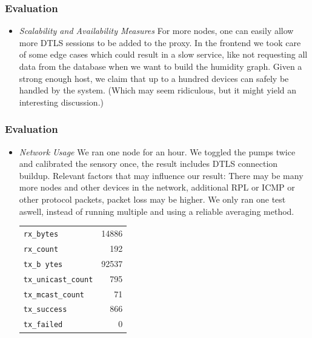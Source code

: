 \documentclass[10pt, xcolor=svgnames]{beamer}
\begin{document}
\begin{frame}
    \frametitle{Evaluation}
    \begin{itemize}
        \item \emph{Scalability and Availability Measures} For more nodes, one can easily allow more DTLS sessions to be added to the proxy. In the frontend we took care of some edge cases which could result in a slow service, like not requesting all data from the database when we want to build the humidity graph. Given a strong enough host, we claim that up to a hundred devices can safely be handled by the system. (Which may seem ridiculous, but it might yield an interesting discussion.)
    \end{itemize}
\end{frame}

\begin{frame}
    \frametitle{Evaluation}
    \begin{itemize}
        \item \emph{Network Usage} We ran one node for an hour. We toggled the pumps twice and calibrated the sensory once, the result includes DTLS connection buildup.  Relevant factors that may influence our result: There may be many more nodes and other devices in the network, additional RPL or ICMP or other protocol packets, packet loss may be higher. We only ran one test aswell, instead of running multiple and using a reliable averaging method.
        \begin{table}
            \begin{tabular}{lr}
                \texttt{rx\_bytes}          & 14886\\
                \texttt{rx\_count}          &   192\\
                \texttt{tx\_b ytes}          & 92537\\
                \texttt{tx\_unicast\_count} &   795\\
                \texttt{tx\_mcast\_count}   &    71\\
                \texttt{tx\_success}        &   866\\
                \texttt{tx\_failed}         &     0
            \end{tabular}
        \end{table}
\end{itemize}
\end{frame}
\end{document}

